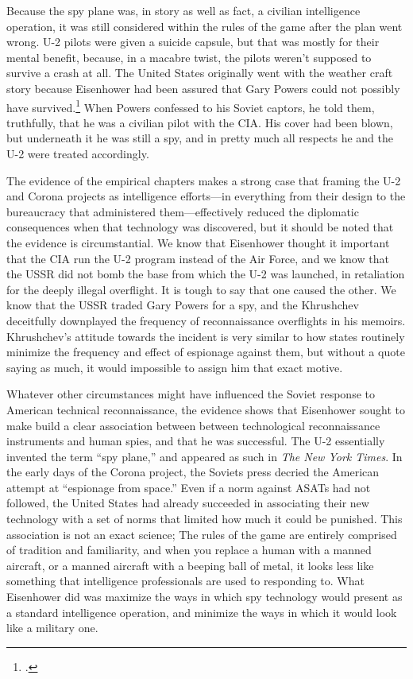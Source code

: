 \documentclass{report}
\begin{document}
Because the spy plane was, in story as well as fact, a civilian intelligence operation, it was still considered within the rules of the game after the plan went wrong. U-2 pilots were given a suicide capsule, but  that was mostly for their mental benefit, because, in a macabre twist, the pilots weren't supposed to survive a crash at all. The United States originally went with the weather craft story because Eisenhower had been assured that Gary Powers could not possibly have survived.\footcite[p.~35]{lindgren_trust_2000} When Powers confessed to his Soviet captors, he told them, truthfully, that he was a civilian pilot with the CIA. His cover had been blown, but underneath it he was still a spy, and in pretty much all respects he and the U-2 were treated accordingly.

The evidence of the empirical chapters makes a strong case that framing the U-2 and Corona projects as intelligence efforts---in everything from their design to the bureaucracy that administered them---effectively reduced the diplomatic consequences when that technology was discovered, but it should be noted that the evidence is circumstantial. We know that Eisenhower thought it important that the CIA run the U-2 program instead of the Air Force, and we know that the USSR did not bomb the base from which the U-2 was launched, in retaliation for the deeply illegal overflight. It is tough to say that one caused the other. We know that the USSR traded Gary Powers for a spy, and the Khrushchev deceitfully downplayed the frequency of reconnaissance overflights in his memoirs. Khrushchev's attitude towards the incident is very similar to how states routinely minimize the frequency and effect of espionage against them, but without a quote saying as much, it would impossible to assign him that exact motive.

Whatever other circumstances might have influenced the Soviet response to American technical reconnaissance, the evidence shows that Eisenhower sought to make build a clear association between between technological reconnaissance instruments and human spies, and that he was successful. The U-2 essentially invented the term ``spy plane,'' and appeared as such in \emph{The New York Times}. In the early days of the Corona project, the Soviets press decried the American attempt at ``espionage from space.'' Even if a norm against ASATs had not followed, the United States had already succeeded in associating their new technology with a set of norms that limited how much it could be punished. This association is not an exact science; The rules of the game are entirely comprised of tradition and familiarity, and when you replace a human with a manned aircraft, or a manned aircraft with a beeping ball of metal, it looks less like something that intelligence professionals are used to responding to. What Eisenhower did was maximize the ways in which spy technology would present as a standard intelligence operation, and minimize the ways in which it would look like a military one.
\end{document}
